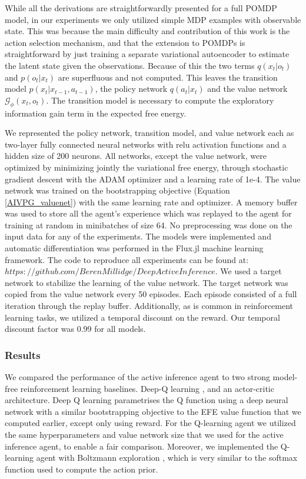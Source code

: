 While all the derivations are straightforwardly presented for a full POMDP model, in our experiments we only utilized simple MDP examples with observable state. This was because the main difficulty and contribution of this work is the action selection mechanism, and that the extension to POMDPs is straightforward by just training a separate variational autoencoder to estimate the latent state given the observations. Because of this the two terms $q(x_t | o_t)$ and $p(o_t | x_t)$ are superfluous and not computed. This leaves the transition model $p(x_t | x_{t-1}, a_{t-1})$, the policy network $q(a_t | x_t)$ and the value network $\mathcal{G}_\phi(x_t, o_t)$. The transition model is necessary to compute the exploratory information gain term in the expected free energy.

We represented the policy network, transition model, and value network each as two-layer fully connected neural networks with relu activation functions and a hidden size of 200 neurons. All networks, except the value network, were optimized by minimizing jointly the variational free energy, through stochastic gradient descent with the ADAM optimizer and a learning rate of 1e-4. The value network was trained on the bootstrapping objective (Equation \ref{AIVPG_valuenet}) with the same learning rate and optimizer. A memory buffer was used to store all the agent's experience which was replayed to the agent for training at random in minibatches of size 64. No preprocessing was done on the input data for any of the experiments. The models were implemented and automatic differentiation was performed in the Flux.jl machine learning framework. The code to reproduce all experiments can be found at: $https://github.com/BerenMillidge/DeepActiveInference$. We used a target network to stabilize the learning of the value network. The target network was copied from the value network every 50 episodes. Each episode consisted of a full iteration through the replay buffer. Additionally, as is common in reinforcement learning tasks, we utilized a temporal discount on the reward. Our temporal discount factor was 0.99 for all models.

\subsubsection{Results}
We compared the performance of the active inference agent to two strong model-free reinforcement learning baselines. Deep-Q learning \citep{mnih2013playing,mnih2015human}, and an actor-critic \citep{mnih2016asynchronous} architecture. Deep Q learning parametrises the Q function using a deep neural network with a similar bootstrapping objective to the EFE value function that we computed earlier, except only using reward. For the Q-learning agent we utilized the same hyperparameters and value network size that we used for the active inference agent, to enable a fair comparison. Moreover, we implemented the Q-learning agent with Boltzmann exploration \citep{cesa2017boltzmann}, which is very similar to the softmax function used to compute the action prior. 

